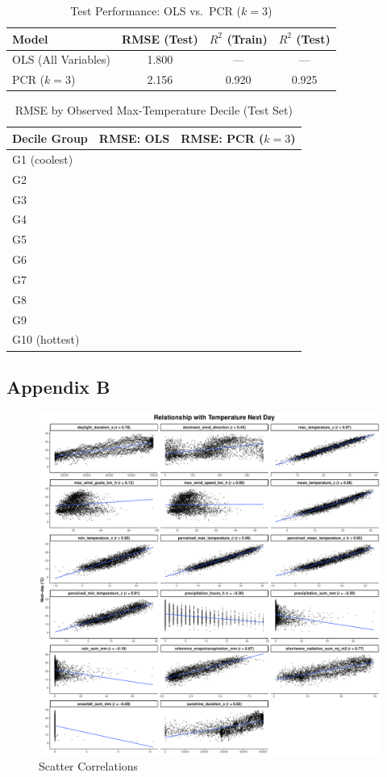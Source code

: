 \documentclass[
]{article}
\begin{document}
\begin{table}[!htbp]\centering
\caption{Test Performance: OLS vs.\ PCR ($k=3$)}
\label{tab:A7}
\begin{tabular}{lccc}
\toprule
Model & RMSE (Test) & $R^{2}$ (Train) & $R^{2}$ (Test) \\
\midrule
OLS (All Variables) & 1.800 & --- & --- \\
PCR ($k=3$) & 2.156 & 0.920 & 0.925 \\
\bottomrule
\end{tabular}
\end{table}

\begin{table}[!htbp]\centering
\caption{RMSE by Observed Max-Temperature Decile (Test Set)}
\label{tab:A8}
\begin{tabular}{lcc}
\toprule
Decile Group & RMSE: OLS & RMSE: PCR ($k=3$) \\
\midrule
G1 (coolest) &  &  \\
G2 &  &  \\
G3 &  &  \\
G4 &  &  \\
G5 &  &  \\
G6 &  &  \\
G7 &  &  \\
G8 &  &  \\
G9 &  &  \\
G10 (hottest) &  &  \\
\bottomrule
\end{tabular}
\end{table}

\subsection{Appendix B}\label{appendix-b}

\begin{figure}[H]

{\centering \includegraphics[width=0.8\linewidth]{Assignment2_Group9_files/figure-latex/unnamed-chunk-1-1} 

}

\caption{Scatter Correlations}\label{fig:unnamed-chunk-1}
\end{figure}
\end{document}
